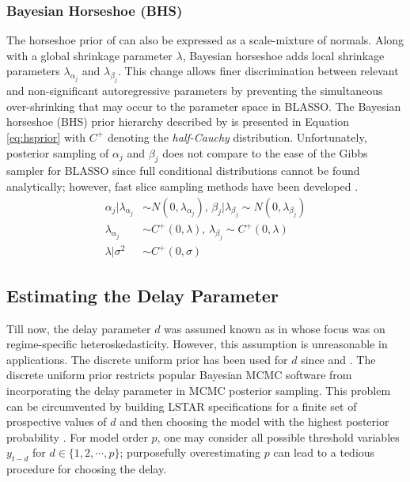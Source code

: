  \subsubsection{Bayesian Horseshoe (BHS)}
 
The horseshoe prior  of \cite{Carvalho2009} can also be expressed as a scale-mixture of normals. Along with a global shrinkage parameter $\lambda$, Bayesian horseshoe adds local shrinkage parameters $\lambda_{\alpha_j}$ and $\lambda_{\beta_j}$. This change allows finer discrimination between relevant and non-significant autoregressive parameters by preventing the simultaneous over-shrinking that may occur to the parameter space in BLASSO. The  Bayesian horseshoe (BHS) prior hierarchy described by \citep{Carvalho2010} is presented in Equation \ref{eq:hsprior} with $C^+$ denoting the \textit{half-Cauchy} distribution. Unfortunately, posterior sampling of $\alpha_j$ and $\beta_j$ does not compare to the ease of the Gibbs sampler for BLASSO since full conditional distributions cannot be found analytically; however, fast slice sampling methods have been developed \citep{Hahn2016}.  
\begin{equation}
\begin{split}
	\label{eq:hsprior}
	\alpha_j|\lambda_{\alpha_j} & \sim N(0,\lambda_{\alpha_j}) \textrm{,  }  \beta_j|\lambda_{\beta_j} \sim N(0,\lambda_{\beta_j}) \\
	  \lambda_{\alpha_j} & \sim C^+(0,\lambda) \textrm{,  } \lambda_{\beta_j} \sim C^+(0,\lambda) \\
	  \lambda|\sigma^2 & \sim C^+(0,\sigma)
\end{split}
\end{equation}

\subsection{Estimating the Delay Parameter}

Till now, the delay parameter $d$ was assumed known as in \cite{Gerlach2008} whose focus was on regime-specific heteroskedasticity. However, this assumption is unreasonable in applications. The discrete uniform prior has been used for $d$ since \cite{Lubrano2000} and \cite{Lopes2006}. The discrete uniform prior restricts popular Bayesian MCMC software from incorporating the delay parameter in MCMC posterior sampling. This problem can be circumvented by building LSTAR specifications for a finite set of prospective values of $d$ and then choosing the model with the highest posterior probability \citep{Deschamps2008}. For model order $p$, one may consider all possible threshold variables $y_{t-d}$ for $d \in \{1,2, \cdots, p\}$; purposefully overestimating $p$ can lead to a tedious procedure for choosing the delay. 

